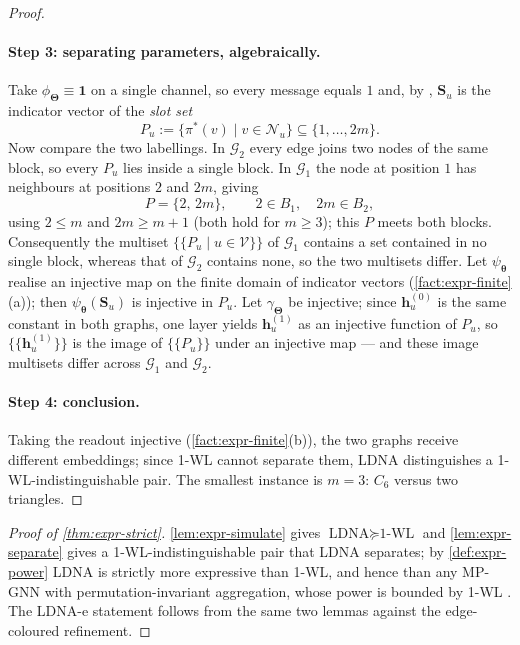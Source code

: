 \begin{proof}
\paragraph{Step 3: separating parameters, algebraically.}
Take $\phi_{\bm{\Theta}}\equiv\mathbf{1}$ on a single channel, so every message
equals $1$ and, by , $\mathbf{S}_u$ is the indicator
vector of the \emph{slot set}
\begin{equation*}
  P_u:=\{\pi^*(v)\mid v\in\mathcal{N}_u\}\subseteq\{1,\dots,2m\} .
\end{equation*}
Now compare the two labellings. In $\mathcal{G}_2$ every edge joins two nodes of
the same block, so every $P_u$ lies inside a single block. In $\mathcal{G}_1$ the
node at position $1$ has neighbours at positions $2$ and $2m$, giving
\begin{equation*}
  P=\{2,\,2m\},\qquad 2\in B_1,\quad 2m\in B_2 ,
\end{equation*}
using $2\le m$ and $2m\ge m+1$ (both hold for $m\ge 3$); this $P$ meets both
blocks. Consequently the multiset $\{\!\{P_u\mid u\in\mathcal{V}\}\!\}$ of
$\mathcal{G}_1$ contains a set contained in no single block, whereas that of
$\mathcal{G}_2$ contains none, so the two multisets differ. Let
$\psi_{\bm{\theta}}$ realise an injective map on the finite domain of indicator
vectors (\cref{fact:expr-finite}(a)); then $\psi_{\bm{\theta}}(\mathbf{S}_u)$ is
injective in $P_u$. Let $\gamma_{\bm{\Theta}}$ be injective; since
$\mathbf{h}_u^{(0)}$ is the same constant in both graphs, one layer yields
$\mathbf{h}_u^{(1)}$ as an injective function of $P_u$, so
$\{\!\{\mathbf{h}_u^{(1)}\}\!\}$ is the image of $\{\!\{P_u\}\!\}$ under an
injective map --- and these image multisets differ across $\mathcal{G}_1$ and
$\mathcal{G}_2$.

\paragraph{Step 4: conclusion.}
Taking the readout injective (\cref{fact:expr-finite}(b)), the two graphs receive
different embeddings; since 1-WL cannot separate them, LDNA distinguishes a
1-WL-indistinguishable pair. The smallest instance is $m=3$: $C_6$ versus two
triangles.
\end{proof}

\begin{proof}[Proof of \cref{thm:expr-strict}]
\cref{lem:expr-simulate} gives $\text{LDNA}\succeq\text{1-WL}$ and
\cref{lem:expr-separate} gives a 1-WL-indistinguishable pair that LDNA separates;
by \cref{def:expr-power} LDNA is strictly more expressive than 1-WL, and hence
than any MP-GNN with permutation-invariant aggregation, whose power is bounded by
1-WL \citep{Xu2019GIN,Morris2019WL}. The LDNA-e statement follows from the same
two lemmas against the edge-coloured refinement.
\end{proof}

